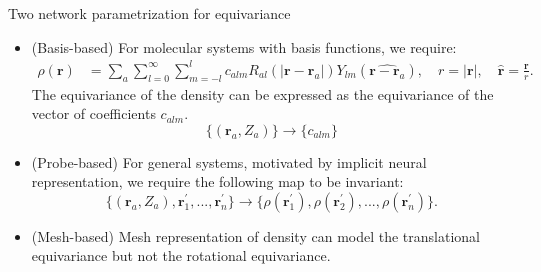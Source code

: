 \begin{frame}{Two network parametrization for equivariance}
    \begin{itemize}
        \item (Basis-based) For molecular systems with basis functions, we require:
        \begin{align*}
            \rho(\mathbf{r}) &= \sum_{a} \sum_{l=0}^{\infty} \sum_{m=-l}^{l} c_{alm}
            R_{al}(|\mathbf{r} - \mathbf{r}_a|)Y_{lm}(\widehat{\mathbf{r} - \mathbf{r}_a}), \quad r = |\mathbf{r}|,
            \quad \widehat{\mathbf{r}} = \frac{\mathbf{r}}{r}.
        \end{align*}
        The equivariance of the density can be expressed as the equivariance of the
        vector of coefficients $c_{alm}$.
        \begin{equation*}
            \{(\mathbf{r}_a, Z_a)\} \rightarrow \{c_{alm}\}
        \end{equation*}
        \item (Probe-based) For general systems, motivated by implicit neural representation, we
        require the following map to be invariant:
        \begin{equation*}
            \{(\mathbf{r}_a, Z_a), \mathbf{r}_1^{\prime}, ..., \mathbf{r}_n^{\prime}\} \rightarrow
            \{\rho(\mathbf{r}_1^{\prime}), \rho(\mathbf{r}_2^{\prime}), ..., \rho(\mathbf{r}_n^{\prime})\}.
        \end{equation*}
        \item (Mesh-based) Mesh representation of density can model the translational equivariance
         but not the rotational equivariance.
    \end{itemize}
\end{frame}


